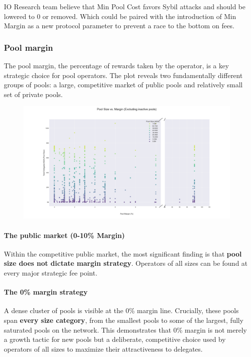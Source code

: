 \documentclass[11pt, letterpaper]{article}
\begin{document}
IO Research team believe that Min Pool Cost favors Sybil attacks and should be lowered to 0 or removed. 
Which could be paired with the introduction of Min Margin as a new protocol parameter to prevent a 
race to the bottom on fees. 

\subsubsection{Pool margin}

The pool margin, the percentage of rewards taken by the operator, is a key strategic
choice for pool operators. The plot reveals two fundamentally different groups of
pools: a large, competitive market of public pools and relatively small set of private pools.

\begin{figure}[H]
	\centering
	\includegraphics[width=\textwidth]{img/pool_margin_vs_size.png}
\end{figure}

\paragraph{The public market (0-10\% Margin)}
Within the competitive public market, the most significant finding is that
\textbf{pool size does not dictate margin strategy}. Operators of all sizes
can be found at every major strategic fee point.

\paragraph{The 0\% margin strategy}
A dense cluster of pools is visible at the 0\% margin line. Crucially,
these pools span \textbf{every size category}, from the smallest pools to some of the largest,
fully saturated pools on the network. This demonstrates that 0\% margin is not merely a
growth tactic for new pools but a deliberate, competitive choice used by operators
of all sizes to maximize their attractiveness to delegates.
\end{document}
